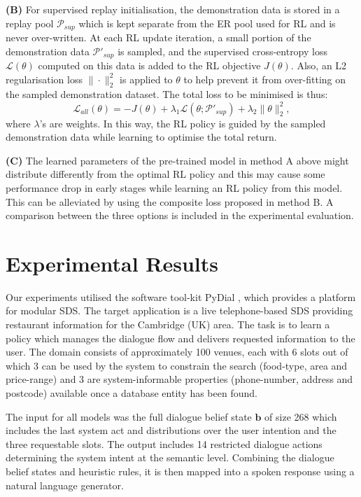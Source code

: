 \documentclass[11pt,a4paper]{article}
\begin{document}
{\bf (B)} For supervised replay initialisation, the demonstration data is stored in a replay pool $\mathcal{P}_{sup}$
which is kept separate from the ER pool used for RL and is never over-written. At each RL update iteration, a small portion of the demonstration data $\mathcal{P'}_{sup}$ is sampled,
and the supervised cross-entropy loss $\mathcal{L}(\theta)$ computed on this data is added to the RL objective $J(\theta)$. Also, an L2 regularisation loss $ \| \cdot \|^2_2$ is applied to $\theta$
to help prevent it from over-fitting on the sampled demonstration dataset. The total loss to be minimised is thus:
\begin{equation}
\mathcal{L}_{all}(\theta) = -J(\theta) + \lambda_1 \mathcal{L}(\theta; \mathcal{P'}_{sup}) + \lambda_2 \| \theta\|^2_2,
\label{eq:loss_all}
\end{equation}
where $\lambda$'s are weights.
In this way, the RL policy is guided by the sampled demonstration data while learning to optimise the total return.

{\bf (C)} The learned parameters of the pre-trained model in method A above might distribute differently from the optimal RL policy and this may cause some performance drop in early stages while learning an RL policy from this model. This can be alleviated by using the composite loss proposed in method B.  A comparison between the three options is included in the experimental evaluation.

\section{Experimental Results}
Our experiments utilised the software tool-kit PyDial \cite{cupydial}, which provides a platform for modular SDS.
The target application is a live telephone-based SDS providing restaurant information for the Cambridge (UK) area. The task is to learn a policy which manages the dialogue flow and delivers requested information to the user.
The domain consists of approximately 100 venues, each with 6 slots out of which 3 can be used by the system to constrain the search (food-type, area and price-range) and 3 are system-informable properties (phone-number, address and postcode) available once a database entity has been found.

The input for all models was the full dialogue belief state $\mathbf{b}$ of size 268 which includes the last system act and distributions over the user intention and the three requestable slots. 
The output includes 14 restricted dialogue actions determining the system intent at the semantic level.
Combining the dialogue belief states and heuristic rules, it is then mapped into a spoken response using a natural language generator.
\end{document}
